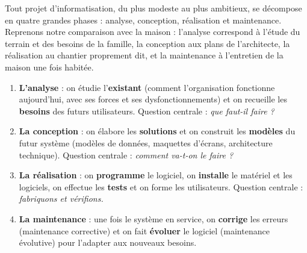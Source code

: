\documentclass[11pt]{article}
\newcommand{\cle}[1]{{\popxbold\color{popdark}#1}}
\begin{document}
Tout projet d'informatisation, du plus modeste au plus ambitieux, se décompose en quatre grandes phases : \cle{analyse}, \cle{conception}, \cle{réalisation} et \cle{maintenance}. Reprenons notre comparaison avec la maison : l'analyse correspond à l'étude du terrain et des besoins de la famille, la conception aux plans de l'architecte, la réalisation au chantier proprement dit, et la maintenance à l'entretien de la maison une fois habitée.

\begin{definition}
\begin{enumerate}
\item \textbf{L'analyse} : on étudie l'\textbf{existant} (comment l'organisation fonctionne aujourd'hui, avec ses forces et ses dysfonctionnements) et on recueille les \textbf{besoins} des futurs utilisateurs. Question centrale : \emph{que faut-il faire ?}
\item \textbf{La conception} : on élabore les \textbf{solutions} et on construit les \textbf{modèles} du futur système (modèles de données, maquettes d'écrans, architecture technique). Question centrale : \emph{comment va-t-on le faire ?}
\item \textbf{La réalisation} : on \textbf{programme} le logiciel, on \textbf{installe} le matériel et les logiciels, on effectue les \textbf{tests} et on forme les utilisateurs. Question centrale : \emph{fabriquons et vérifions.}
\item \textbf{La maintenance} : une fois le système en service, on \textbf{corrige} les erreurs (maintenance corrective) et on fait \textbf{évoluer} le logiciel (maintenance évolutive) pour l'adapter aux nouveaux besoins.
\end{enumerate}
\end{definition}
\end{document}
